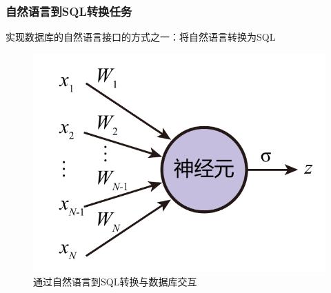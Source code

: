\documentclass{ctexbeamer}
\begin{document}
\begin{frame}
  \frametitle{自然语言到SQL转换任务}
  实现数据库的自然语言接口的方式之一：将自然语言转换为SQL
  \begin{figure}
    \includegraphics[page=13]{figure/figures.pdf}
    \caption{通过自然语言到SQL转换与数据库交互}
  \end{figure}
\end{frame}
\end{document}
